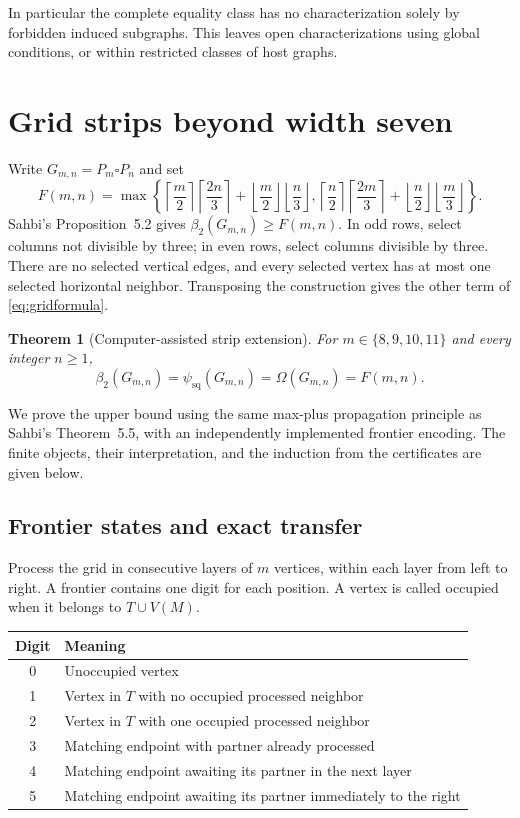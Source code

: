\documentclass[11pt]{article}
\newtheorem{theorem}{Theorem}[section]
\theoremstyle{definition}
\theoremstyle{remark}
\newcommand{\psq}{\psi_{\mathrm{sq}}}
\newcommand{\bii}{\beta_2}
\newcommand{\Om}{\Omega}
\begin{document}
In particular the complete equality class has no characterization solely
by forbidden induced subgraphs. This leaves open characterizations using
global conditions, or within restricted classes of host graphs.

\section{Grid strips beyond width seven}\label{sec:grid}

Write $G_{m,n}=P_m\square P_n$ and set
\begin{equation}\label{eq:gridformula}
 F(m,n)=\max\left\{
 \left\lceil\frac m2\right\rceil\left\lceil\frac{2n}3\right\rceil
 +\left\lfloor\frac m2\right\rfloor\left\lfloor\frac n3\right\rfloor,
 \left\lceil\frac n2\right\rceil\left\lceil\frac{2m}3\right\rceil
 +\left\lfloor\frac n2\right\rfloor\left\lfloor\frac m3\right\rfloor
 \right\}.
\end{equation}
Sahbi's Proposition~5.2 gives $\bii(G_{m,n})\ge F(m,n)$. In odd rows,
select columns not divisible by three; in even rows, select columns
divisible by three. There are no selected vertical edges, and every
selected vertex has at most one selected horizontal neighbor. Transposing
the construction gives the other term of \eqref{eq:gridformula}.

\begin{theorem}[Computer-assisted strip extension]\label{thm:strips}
For $m\in\{8,9,10,11\}$ and every integer $n\ge1$,
\[
 \bii(G_{m,n})=\psq(G_{m,n})=\Om(G_{m,n})=F(m,n).
\]
\end{theorem}

We prove the upper bound using the same max-plus propagation principle as
Sahbi's Theorem~5.5, with an independently implemented frontier encoding.
The finite objects, their interpretation, and the induction from the
certificates are given below.

\subsection{Frontier states and exact transfer}

Process the grid in consecutive layers of $m$ vertices, within each layer
from left to right. A frontier contains one digit for each position. A
vertex is called occupied when it belongs to $T\cup V(M)$.

\begin{center}
\begin{tabular}{cl}
\toprule
Digit & Meaning\\\midrule
0 & Unoccupied vertex\\
1 & Vertex in $T$ with no occupied processed neighbor\\
2 & Vertex in $T$ with one occupied processed neighbor\\
3 & Matching endpoint with partner already processed\\
4 & Matching endpoint awaiting its partner in the next layer\\
5 & Matching endpoint awaiting its partner immediately to the right\\
\bottomrule
\end{tabular}
\end{center}
\end{document}
